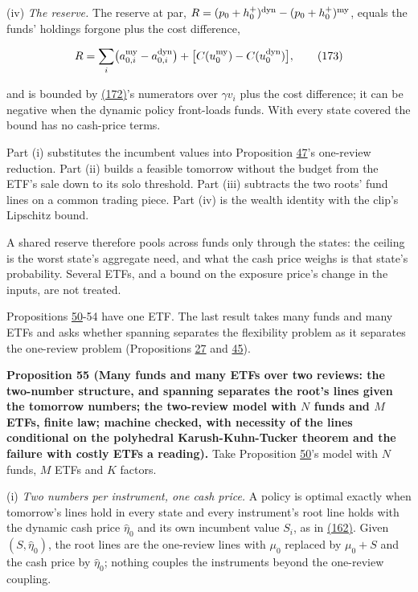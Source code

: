 \documentclass[11pt]{article}
\begin{document}
(iv) \emph{The reserve.} The reserve at par, \(R=(p_0+h^+_0)^{\rm dyn}-(p_0+h^+_0)^{\rm my}\),
equals the funds' holdings forgone plus the cost difference,

\begin{equation*}
R=\sum_i\bigl(a^{\rm my}_{0,i}-a^{\rm dyn}_{0,i}\bigr)+\bigl[C(u^{\rm my}_0)-C(u^{\rm dyn}_0)\bigr],\tag{173}\label{eq:173}
\end{equation*}

and is bounded by \hyperref[eq:172]{(172)}'s numerators over \(\gamma v_i\) plus the cost difference;
it can be negative when the dynamic policy front-loads funds. With
every state covered the bound has no cash-price terms.

Part (i) substitutes the incumbent values into Proposition \hyperref[res:Proposition-47]{47}'s
one-review reduction. Part (ii) builds a feasible tomorrow without the
budget from the ETF's sale down to its solo threshold. Part (iii)
subtracts the two roots' fund lines on a common trading piece. Part
(iv) is the wealth identity with the clip's Lipschitz bound.

A shared reserve therefore pools across funds only through the states:
the ceiling is the worst state's aggregate need, and what the cash
price weighs is that state's probability. Several ETFs, and a bound on
the exposure price's change in the inputs, are not treated.

Propositions \hyperref[res:Proposition-50]{50}-54 have one ETF. The last result takes many funds and
many ETFs and asks whether spanning separates the flexibility problem
as it separates the one-review problem (Propositions \hyperref[res:Proposition-27]{27} and \hyperref[res:Proposition-45]{45}).

\label{res:Proposition-55}
\textbf{Proposition 55 (Many funds and many ETFs over two reviews: the two-number structure, and spanning separates the root's lines given the tomorrow numbers; the two-review model with \(N\) funds and \(M\) ETFs, finite law; machine checked, with necessity of the lines conditional on the polyhedral Karush-Kuhn-Tucker theorem and the failure with costly ETFs a reading).}
Take Proposition \hyperref[res:Proposition-50]{50}'s model with \(N\) funds, \(M\) ETFs and \(K\) factors.

(i) \emph{Two numbers per instrument, one cash price.} A policy is optimal
exactly when tomorrow's lines hold in every state and every
instrument's root line holds with the dynamic cash price \(\hat\eta_0\) and its
own incumbent value \(S_i\), as in \hyperref[eq:162]{(162)}. Given \((S,\hat\eta_0)\), the root lines are
the one-review lines with \(\mu_0\) replaced by \(\mu_0+S\) and the cash price by
\(\hat\eta_0\); nothing couples the instruments beyond the one-review coupling.
\end{document}
